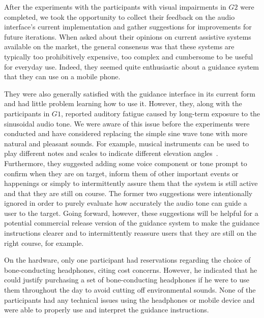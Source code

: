 \documentclass[sigconf, screen=true, anonymous=true]{acmart}
\begin{document}
After the experiments with the participants with visual impairments in $G2$ were completed, we took the opportunity to collect their feedback on the audio interface's current implementation and gather suggestions for improvements for future iterations.
When asked about their opinions on current assistive systems available on the market, the general consensus was that these systems are typically too prohibitively expensive, too complex and cumbersome to be useful for everyday use.
Indeed, they seemed quite enthusiastic about a guidance system that they can use on a mobile phone.

They were also generally satisfied with the guidance interface in its current form and had little problem learning how to use it.
However, they, along with the participants in $G1$, reported auditory fatigue caused by long-term exposure to the sinusoidal audio tone.
We were aware of this issue before the experiments were conducted and have considered replacing the simple sine wave tone with more natural and pleasant sounds.
For example, musical instruments can be used to play different notes and scales to indicate different elevation angles~\cite{brewster1998using}.
Furthermore, they suggested adding some voice component or tone prompt to confirm when they are on target, inform them of other important events or happenings or simply to intermittently assure them that the system is still active and that they are still on course.
The former two suggestions were intentionally ignored in order to purely evaluate how accurately the audio tone can guide a user to the target.
Going forward, however, these suggestions will be helpful for a potential commercial release version of the guidance system to make the guidance instructions clearer and to intermittently reassure users that they are still on the right course, for example.

On the hardware, only one participant had reservations regarding the choice of bone-conducting headphones, citing cost concerns. 
However, he indicated that he could justify purchasing a set of bone-conducting headphones if he were to use them throughout the day to avoid cutting off environmental sounds.
None of the participants had any technical issues using the headphones or mobile device and were able to properly use and interpret the guidance instructions.


\end{document}
